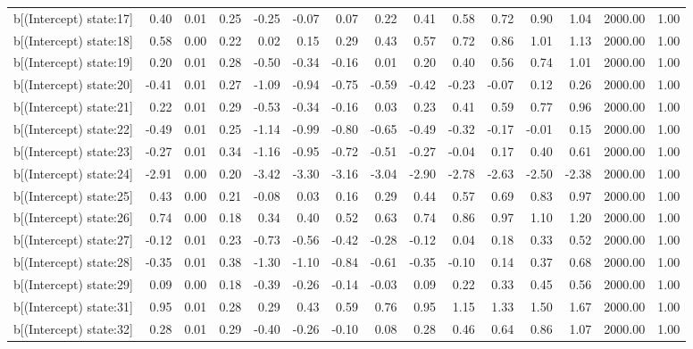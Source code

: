 \begin{table}[ht]
\begin{tabular}{rrrrrrrrrrrrrrr}
  b[(Intercept) state:17] & 0.40 & 0.01 & 0.25 & -0.25 & -0.07 & 0.07 & 0.22 & 0.41 & 0.58 & 0.72 & 0.90 & 1.04 & 2000.00 & 1.00 \\ 
  b[(Intercept) state:18] & 0.58 & 0.00 & 0.22 & 0.02 & 0.15 & 0.29 & 0.43 & 0.57 & 0.72 & 0.86 & 1.01 & 1.13 & 2000.00 & 1.00 \\ 
  b[(Intercept) state:19] & 0.20 & 0.01 & 0.28 & -0.50 & -0.34 & -0.16 & 0.01 & 0.20 & 0.40 & 0.56 & 0.74 & 1.01 & 2000.00 & 1.00 \\ 
  b[(Intercept) state:20] & -0.41 & 0.01 & 0.27 & -1.09 & -0.94 & -0.75 & -0.59 & -0.42 & -0.23 & -0.07 & 0.12 & 0.26 & 2000.00 & 1.00 \\ 
  b[(Intercept) state:21] & 0.22 & 0.01 & 0.29 & -0.53 & -0.34 & -0.16 & 0.03 & 0.23 & 0.41 & 0.59 & 0.77 & 0.96 & 2000.00 & 1.00 \\ 
  b[(Intercept) state:22] & -0.49 & 0.01 & 0.25 & -1.14 & -0.99 & -0.80 & -0.65 & -0.49 & -0.32 & -0.17 & -0.01 & 0.15 & 2000.00 & 1.00 \\ 
  b[(Intercept) state:23] & -0.27 & 0.01 & 0.34 & -1.16 & -0.95 & -0.72 & -0.51 & -0.27 & -0.04 & 0.17 & 0.40 & 0.61 & 2000.00 & 1.00 \\ 
  b[(Intercept) state:24] & -2.91 & 0.00 & 0.20 & -3.42 & -3.30 & -3.16 & -3.04 & -2.90 & -2.78 & -2.63 & -2.50 & -2.38 & 2000.00 & 1.00 \\ 
  b[(Intercept) state:25] & 0.43 & 0.00 & 0.21 & -0.08 & 0.03 & 0.16 & 0.29 & 0.44 & 0.57 & 0.69 & 0.83 & 0.97 & 2000.00 & 1.00 \\ 
  b[(Intercept) state:26] & 0.74 & 0.00 & 0.18 & 0.34 & 0.40 & 0.52 & 0.63 & 0.74 & 0.86 & 0.97 & 1.10 & 1.20 & 2000.00 & 1.00 \\ 
  b[(Intercept) state:27] & -0.12 & 0.01 & 0.23 & -0.73 & -0.56 & -0.42 & -0.28 & -0.12 & 0.04 & 0.18 & 0.33 & 0.52 & 2000.00 & 1.00 \\ 
  b[(Intercept) state:28] & -0.35 & 0.01 & 0.38 & -1.30 & -1.10 & -0.84 & -0.61 & -0.35 & -0.10 & 0.14 & 0.37 & 0.68 & 2000.00 & 1.00 \\ 
  b[(Intercept) state:29] & 0.09 & 0.00 & 0.18 & -0.39 & -0.26 & -0.14 & -0.03 & 0.09 & 0.22 & 0.33 & 0.45 & 0.56 & 2000.00 & 1.00 \\ 
  b[(Intercept) state:31] & 0.95 & 0.01 & 0.28 & 0.29 & 0.43 & 0.59 & 0.76 & 0.95 & 1.15 & 1.33 & 1.50 & 1.67 & 2000.00 & 1.00 \\ 
  b[(Intercept) state:32] & 0.28 & 0.01 & 0.29 & -0.40 & -0.26 & -0.10 & 0.08 & 0.28 & 0.46 & 0.64 & 0.86 & 1.07 & 2000.00 & 1.00 \\ 

\end{tabular}
\end{table}

